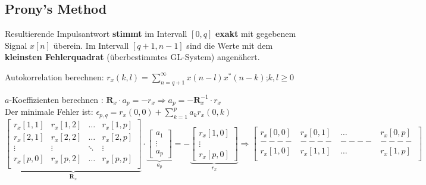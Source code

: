 \vspace{-1.0cm}


\subsection{Prony's Method }
Resultierende Impulsantwort \textbf{stimmt} im Intervall $[0, q]$ \textbf{exakt} mit
gegebenem Signal $x[n]$ überein. Im Intervall $[q + 1, n-1]$ sind die
Werte mit dem \textbf{kleinsten Fehlerquadrat} (überbestimmtes GL-System)
angenähert. 

\renewcommand{\arraystretch}{1.0}

\begin{aufzaehlung}
	\item Autokorrelation berechnen: $ r_x(k,l) = \sum\limits_{n=q+1}^\infty x(n-l)x^*(n-k)$;\qquad $k,l\geq 0$
	\item $a$-Koeffizienten berechnen : $\bm R_x \cdot a_p = -r_x \Longrightarrow a_p = - \bm R_x^{-1} \cdot r_x$ 
  		 \small\\
		Der minimale Fehler ist: $\epsilon_{p,q} = r_x(0,0) + \sum\limits_{k=1}^p a_k r_x(0,k)$
			$$
		\underbrace{\begin{bmatrix}
    		r_x[1,1] & r_x[1,2] & \hdots & r_x[1,p] \\                                   
    		r_x[2,1] & r_x[2,2] & \hdots & r_x[2,p] \\
    		\vdots & \vdots & \ddots & \vdots \\                             
    		r_x[p,0] & r_x[p,2] & \hdots & r_x[p,p] \\                        
		\end{bmatrix}  }_{\bm R_x} \cdot 
		\underbrace{\begin{bmatrix}
    		a_1 \\
    		\vdots \\
    		a_p
		\end{bmatrix}  }_{a_p}= -\underbrace{\begin{bmatrix}
    		r_x[1,0] \\
    		\vdots \\
    		r_x[p,0]
		\end{bmatrix}  }_{r_x}
		\Longrightarrow
		\begin{bmatrix}
    		r_x[0,0] & r_x[0,1] & \hdots & r_x[0,p] \\ 
    		----&----&----&----\\
    		r_x[1,0] & r_x[1,1] & \hdots & r_x[1,p] \\                                   

\end{bmatrix}$$
\end{aufzaehlung}
